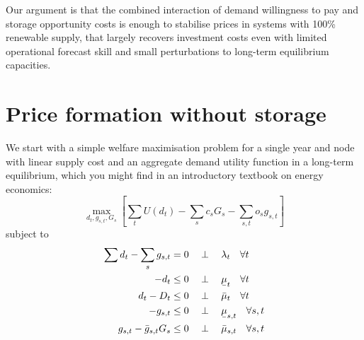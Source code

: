 \documentclass[final,3p]{elsarticle}
\def\l{\lambda} \def\K{\kappa} \def\m{\mu} \def\G{\Gamma} \def\d{\partial}
\begin{document}
Our argument is that the combined interaction of demand willingness to pay and
storage opportunity costs is enough to stabilise prices in systems with 100\%
renewable supply, that largely recovers investment costs even with limited
operational forecast skill and small perturbations to long-term equilibrium
capacities.

\section*{Price formation without storage}\label{sec:generators}

We start with a simple welfare maximisation problem for a single year and node
with linear supply cost and an aggregate demand utility function in a long-term
equilibrium, which you might find in an introductory textbook on energy
economics:
\begin{equation}
  \max_{d_{t}, g_{s,t}, G_s}\left[\sum_{t} U(d_t) -  \sum_s c_s G_s - \sum_{s,t} o_{s} g_{s,t}\right]  \label{eq:objl}
\end{equation}
subject to
\begin{align}
  \sum d_{t} - \sum_s g_{s,t} & =  0 \hspace{0.34cm}\perp \hspace{0.34cm} \l_t \hspace{0.34cm} \forall t \label{eq:balance} \\
  -d_{t}                        & \leq 0 \hspace{0.34cm}\perp \hspace{0.34cm} \ubar{\mu}_{t} \hspace{0.34cm} \forall t  \label{eq:dem-lower}  \\
  d_{t} - D_{t}               & \leq 0 \hspace{0.34cm}\perp \hspace{0.34cm} \bar{\mu}_{t} \hspace{0.34cm} \forall t   \label{eq:dem-upper}  \\
  -g_{s,t}                        & \leq 0 \hspace{0.34cm}\perp \hspace{0.34cm} \ubar{\mu}_{s,t} \hspace{0.34cm} \forall s,t   \label{eq:gen-lower} \\
  g_{s,t} - \bar{g}_{s,t} G_s     & \leq 0 \hspace{0.34cm}\perp \hspace{0.34cm} \bar{\mu}_{s,t} \hspace{0.34cm} \forall s,t \label{eq:gen-upper}
\end{align}
\end{document}
